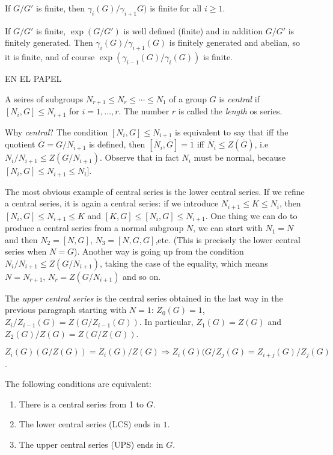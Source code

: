 \documentclass[twoside, 11pt]{article}
\begin{document}
\begin{coro}
If $G/G'$ is finite, then $\gamma_i(G)/\gamma_{i+1}G)$ is finite for all $i\geq 1$. 
\end{coro}
\begin{dem}
If $G/G'$ is finite, $\exp(G/G')$ is well defined (finite) and in addition $G/G'$ is finitely generated. Then $\gamma_i(G)/\gamma_{i+1}(G)$ is finitely generated and abelian, so it is finite, and of course $\exp(\gamma_{i-1}(G)/\gamma_i(G))$ is finite. 
\end{dem}
\begin{ej}
EN EL PAPEL
\end{ej}

\begin{defi}
A seires of subgroups $N_{r+1}\leq N_r\leq\cdots\leq N_1$ of a group $G$ is \emph{central} if $[N_i,G]\leq N_{i+1}$ for $i=1,\dots, r$. The number $r$ is called the \emph{length} os series.
\end{defi}

Why \emph{central}? The condition $[N_i,G]\leq N_{i+1}$ is equivalent to say that iff the quotient $\overline{G}=G/N_{i+1}$ is defined, then $[\overline{N}_i,\overline{G}]=\overline{1}$ iff $\overline{N}_i\leq Z(\overline{G})$, i.e $N_i/N_{i+1}\leq Z(G/N_{i+1})$. Observe that in fact $N_i$ must be normal, because $[N_i,G]\leq N_{i+1}\leq N_i]$. 

The most obvious example of central series is the lower central series. If we refine a central series, it is again a central series: if we introduce $N_{i+1}\leq K\leq N_i$, then $[N_i,G]\leq N_{i+1}\leq K$ and $[K,G]\leq [N_i,G]\leq N_{i+1}$. One thing we can do to produce a central series from a normal subgroup $N$, we can start with $N_1=N$ and then $N_2=[N,G]$, $N_3=[N,G,G]$,etc. (This is precisely the lower central series when $N=G$). Another way is going up from the condition $N_i/N_{i+1}\leq Z(G/N_{i+1})$, taking the case of the equality, which means $N=N_{r+1}$, $N_r=Z(G/N_{i+1})$ and so on.

\begin{defi}
The \emph{upper central series} is the central series obtained in the last way in the previous paragraph starting with $N=1$: $Z_0(G)=1$, $Z_i/Z_{i-1}(G)=Z(G/Z_{i-1}(G))$. In particular, $Z_1(G)=Z(G)$ and $Z_2(G)/Z(G)=Z(G/Z(G))$. 
\end{defi}

$Z_i(G)(G/Z(G))=Z_i(G)/Z(G)\Rightarrow Z_i(G)(G/Z_j(G)=Z_{i+j}(G)/Z_j(G)$.

\begin{teorema}
The following conditions are equivalent:
\begin{enumerate}
\item There is a central series from 1 to $G$.
\item The lower central series (LCS) ends in $1$.
\item The upper central series (UPS) ends in $G$.
\end{enumerate}
\end{teorema}
\end{document}
